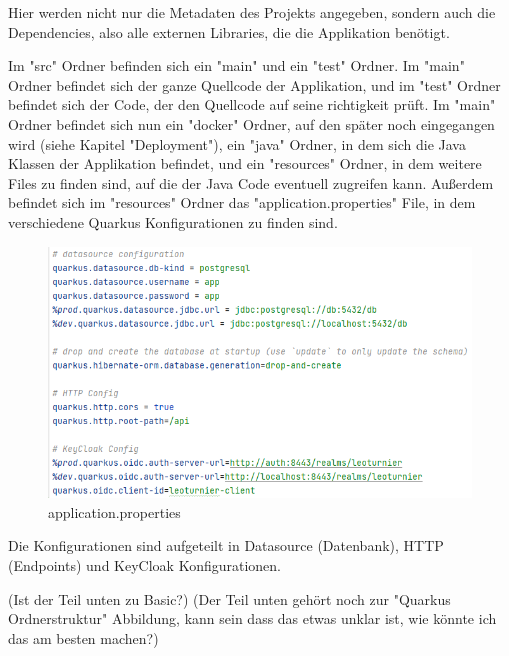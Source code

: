 Hier werden nicht nur die Metadaten des Projekts angegeben, sondern auch die Dependencies, also alle externen Libraries, die die Applikation benötigt. 

Im "src" Ordner befinden sich ein "main" und ein "test" Ordner. Im "main" Ordner befindet sich der ganze Quellcode der Applikation, und im "test" Ordner befindet sich der Code, der den Quellcode auf seine richtigkeit prüft.
Im "main" Ordner befindet sich nun ein "docker" Ordner, auf den später noch eingegangen wird (siehe Kapitel "Deployment"), ein "java" Ordner, in dem sich die Java Klassen der Applikation befindet, und ein "resources" Ordner, in dem weitere Files zu finden sind, 
auf die der Java Code eventuell zugreifen kann. Außerdem befindet sich im "resources" Ordner das "application.properties" File, in dem verschiedene Quarkus Konfigurationen zu finden sind.

\begin{figure}[H]
    \includegraphics[scale=0.6]{pics/backend/application.properties.png}
    \caption{application.properties}
\end{figure}

Die Konfigurationen sind aufgeteilt in Datasource (Datenbank), HTTP (Endpoints) und KeyCloak Konfigurationen. 

(Ist der Teil unten zu Basic?) (Der Teil unten gehört noch zur "Quarkus Ordnerstruktur" Abbildung, kann sein dass das etwas unklar ist, wie könnte ich das am besten machen?)

